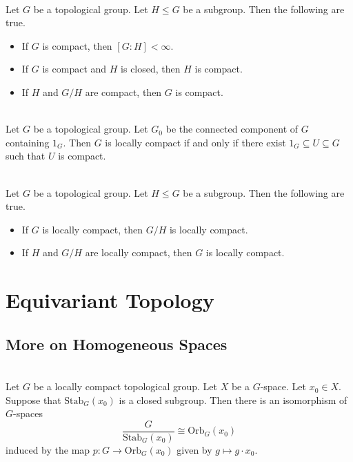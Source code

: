 \documentclass[a4paper]{article}
\begin{document}
\begin{prp}{}{}\\
Let $G$ be a topological group. Let $H\leq G$ be a subgroup. Then the following are true. 
\begin{itemize}
\item If $G$ is compact, then $[G:H]<\infty$. 
\item If $G$ is compact and $H$ is closed, then $H$ is compact. 
\item If $H$ and $G/H$ are compact, then $G$ is compact. 
\end{itemize}
\end{prp}

\begin{prp}{}{}\\
Let $G$ be a topological group. Let $G_0$ be the connected component of $G$ containing $1_G$. Then $G$ is locally compact if and only if there exist $1_G\subseteq U\subseteq G$ such that $U$ is compact. 
\end{prp}

\begin{prp}{}{}\\
Let $G$ be a topological group. Let $H\leq G$ be a subgroup. Then the following are true. 
\begin{itemize}
\item If $G$ is locally compact, then $G/H$ is locally compact. 
\item If $H$ and $G/H$ are locally compact, then $G$ is locally compact. 
\end{itemize}
\end{prp}

\pagebreak
\section{Equivariant Topology}
\subsection{More on Homogeneous Spaces}
\begin{prp}{}{}\\
Let $G$ be a locally compact topological group. Let $X$ be a $G$-space. Let $x_0\in X$. Suppose that $\text{Stab}_G(x_0)$ is a closed subgroup. Then there is an isomorphism of $G$-spaces $$\frac{G}{\text{Stab}_G(x_0)}\cong\text{Orb}_G(x_0)$$ induced by the map $p:G\to\text{Orb}_G(x_0)$ given by $g\mapsto g\cdot x_0$. 
\end{prp}
\end{document}

